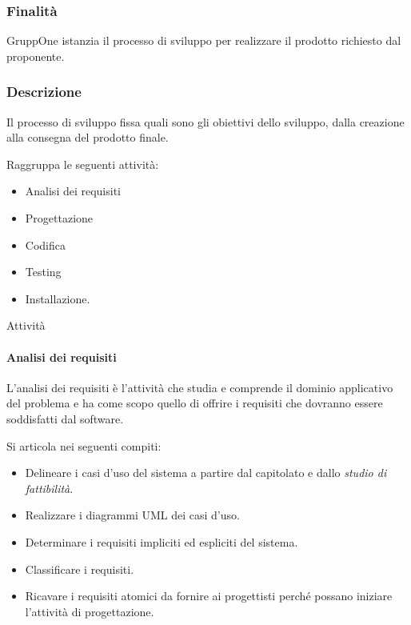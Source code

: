 \documentclass[../../norme-di-progetto.tex]{subfiles}
\begin{document}
\subsubsection{Finalità}%
\label{subs:sviluppo/finalita}

GruppOne istanzia il processo di sviluppo per realizzare il prodotto richiesto dal proponente.

\subsubsection{Descrizione}%
\label{subs:sviluppo/descrizione}

Il processo di sviluppo fissa quali sono gli obiettivi dello sviluppo, dalla creazione alla consegna del prodotto finale.

Raggruppa le seguenti attività:
\begin{itemize}
  \item Analisi dei requisiti
  \item Progettazione
  \item Codifica
  \item Testing
  \item Installazione.
\end{itemize}

{Attività}%
\label{subs:sviluppo/attivita}

\paragraph{Analisi dei requisiti}%
\label{par:analisi_dei_requisiti}
L'analisi dei requisiti è l'attività che studia e comprende il dominio applicativo del problema e ha come scopo quello di offrire i requisiti che dovranno essere soddisfatti dal software.

Si articola nei seguenti compiti:

\begin{itemize}
  \item Delineare i casi d'uso del sistema a partire dal capitolato e dallo \textit{studio di fattibilità}.
  \item Realizzare i diagrammi UML dei casi d'uso.
  \item Determinare i requisiti impliciti ed espliciti del sistema.
  \item Classificare i requisiti.
  \item Ricavare i requisiti atomici da fornire ai progettisti perché possano iniziare l'attività di progettazione.
\end{itemize}
\end{document}
